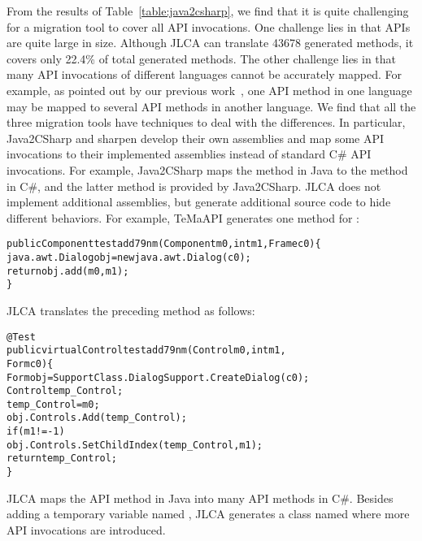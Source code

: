 From the results of Table~\ref{table:java2csharp}, we find that it is quite challenging for a migration tool to cover all API invocations. One challenge lies in that APIs are quite large in size. Although JLCA can translate 43678 generated methods, it covers only 22.4\% of total generated methods. The other challenge lies in that many API invocations of different languages cannot be accurately mapped. For example, as pointed out by our previous work~\cite{zhong2010mining}, one API method in one language may be mapped to several API methods in another language. We find that all the three migration tools have techniques to deal with the differences. In particular, Java2CSharp and sharpen develop their own assemblies and map some API invocations to their implemented assemblies instead of standard C\# API invocations. For example, Java2CSharp maps the  method in Java to the  method in C\#, and the latter method is provided by Java2CSharp. JLCA does not implement additional assemblies, but generate additional source code to hide different behaviors. For example, TeMaAPI generates one method for  :

\begin{CodeOut}%
\begin{alltt}
public Component testadd79nm(Component m0,int m1,Frame c0)\{
  java.awt.Dialog obj = new java.awt.Dialog(c0);
  return obj.add(m0,m1);
\}
\end{alltt}
\end{CodeOut}

JLCA translates the preceding method as follows:

\begin{CodeOut}%
\begin{alltt}
@Test
public virtual Control testadd79nm(Control m0, int m1, 
                                              Form c0)\{
  Form obj = SupportClass.DialogSupport.CreateDialog(c0);
  Control temp_Control;
  temp_Control = m0;
  obj.Controls.Add(temp_Control);
  if (m1 != -1)
    obj.Controls.SetChildIndex(temp_Control, m1);
  return temp_Control;
\}
\end{alltt}
\end{CodeOut}

JLCA maps the API method in Java into many API methods in C\#. Besides adding a temporary variable named , JLCA generates a class named  where more API invocations are introduced.

